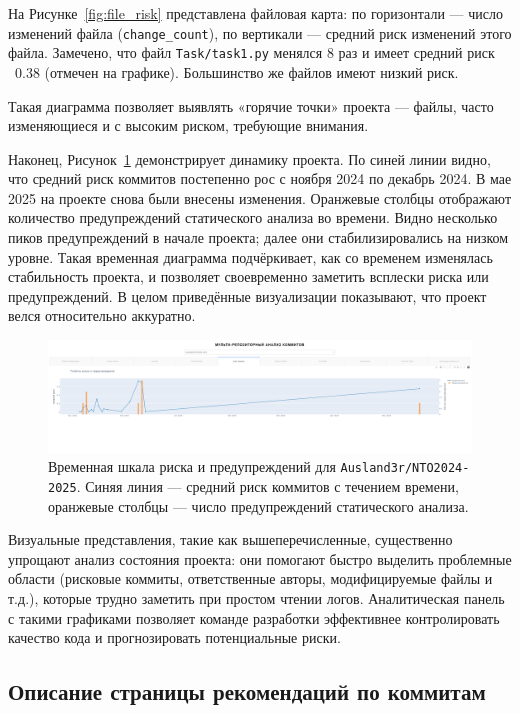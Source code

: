 На Рисунке~\ref{fig:file_risk} представлена файловая карта: по горизонтали — число изменений файла (\texttt{change\_count}), по вертикали — средний риск изменений этого файла. Замечено, что файл \texttt{Task/task1.py} менялся 8 раз и имеет средний риск ~0.38 (отмечен на графике). Большинство же файлов имеют низкий риск. 

Такая диаграмма позволяет выявлять «горячие точки» проекта — файлы, часто изменяющиеся и с высоким риском, требующие внимания. 


Наконец, Рисунок~\ref{fig:timeline} демонстрирует динамику проекта. По синей линии видно, что средний риск коммитов постепенно рос с ноября 2024 по декабрь 2024. В мае 2025 на проекте снова были внесены изменения. Оранжевые столбцы отображают количество предупреждений статического анализа во времени. Видно несколько пиков предупреждений в начале проекта; далее они стабилизировались на низком уровне. Такая временная диаграмма подчёркивает, как со временем изменялась стабильность проекта, и позволяет своевременно заметить всплески риска или предупреждений. В целом приведённые визуализации показывают, что проект велся относительно аккуратно. 



\begin{figure}[ht]
	\centering
	\includegraphics[width=\textwidth]{my_folder/images/fifth_page.png}
	\caption{Временная шкала риска и предупреждений для \texttt{Ausland3r/NTO2024-2025}. Синяя линия — средний риск коммитов с течением времени, оранжевые столбцы — число предупреждений статического анализа.}
	\label{fig:timeline}
\end{figure}

Визуальные представления, такие как вышеперечисленные, существенно упрощают анализ состояния проекта: они помогают быстро выделить проблемные области (рисковые коммиты, ответственные авторы, модифицируемые файлы и т.д.), которые трудно заметить при простом чтении логов. Аналитическая панель с такими графиками позволяет команде разработки эффективнее контролировать качество кода и прогнозировать потенциальные риски. 

\subsection{Описание страницы рекомендаций по коммитам}

